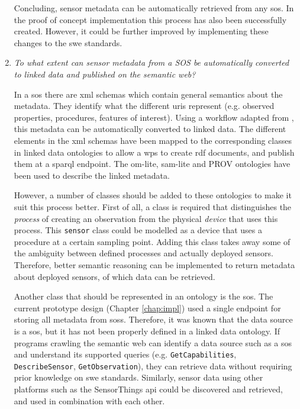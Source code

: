 \begin{enumerate}
Concluding, sensor metadata can be automatically retrieved from any \ac{sos}. In the proof of concept implementation this process has also been successfully created. However, it could be further improved by implementing these changes to the \ac{swe} standards.

\item \textit{To what extent can sensor metadata from a SOS be automatically converted to linked data and published on the semantic web?}%

In a \ac{sos} there are \ac{xml} schemas which contain general semantics about the metadata. They identify what the different \acp{uri} represent (e.g. observed properties, procedures, features of interest). Using a workflow adapted from \cite{LD:Missier}, this metadata can be automatically converted to linked data. The different elements in the \ac{xml} schemas have been mapped to the corresponding classes in linked data ontologies to allow a \ac{wps} to create \ac{rdf} documents, and publish them at a \ac{sparql} endpoint. The om-lite, sam-lite and PROV ontologies have been used to describe the linked metadata.

However, a number of classes should be added to these ontologies to make it suit this process better. First of all, a class is required that distinguishes the \textit{process} of creating an observation from the physical \textit{device} that uses this process. This \texttt{sensor} class could be modelled as a device that uses a procedure at a certain sampling point. Adding this class takes away some of the ambiguity between defined processes and actually deployed sensors. Therefore, better semantic reasoning can be implemented to return metadata about deployed sensors, of which data can be retrieved.  

Another class that should be represented in an ontology is the \acl{sos}. The current prototype design (Chapter \ref{chap:impl}) used a single endpoint for storing all metadata from \aclp{sos}. Therefore, it was known that the data source is a \ac{sos}, but it has not been properly defined in a linked data ontology. If programs crawling the semantic web can identify a data source such as a \ac{sos} and understand its supported queries (e.g. \texttt{GetCapabilities}, \texttt{DescribeSensor}, \texttt{GetObservation}), they can retrieve data without requiring prior knowledge on \ac{swe} standards. Similarly, sensor data using other platforms such as the SensorThings \ac{api} could be discovered and retrieved, and used in combination with each other.           


\end{enumerate}
